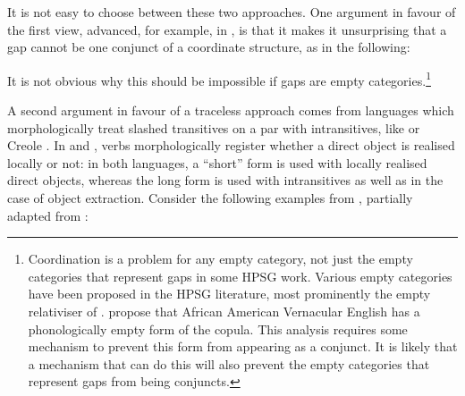 \documentclass[output=paper
,notxmath 
 	        ,biblatex
                ,babelshorthands
                ,newtxmath
                ,draftmode
                ,colorlinks, citecolor=brown
]{langscibook}
\begin{document}
It is not easy to choose between these two approaches. One argument in
favour of the first view, advanced, for example, in \citet[Section~3.5.2]{Bouma:Malouf:Sag:01}, is that it makes it unsurprising that a gap cannot be one
conjunct of a coordinate structure, as in the following:

\begin{exe} \ex \begin{xlist} \label{ex:UDC:22}

\end{xlist}
\end{exe}

\noindent
It is not obvious why this should be impossible if gaps are empty
categories.\footnote{Coordination is a problem for any empty category,
  not just the empty categories that represent gaps in some HPSG
  work. Various empty categories have been proposed in the HPSG
  literature, most prominently the empty relativiser of
  \citet[Chapter~5]{Pollard:Sag:94}. \citet[Section~15.3.5]{Sag:Wasow:ea:03}
  propose that African American Vernacular English has a
  phonologically empty form of the copula. This analysis requires some
  mechanism to prevent this form from appearing as a conjunct. It is
  likely that a mechanism that can do this will also prevent the empty
  categories that represent gaps from being conjuncts.
 }

 A second argument in favour of a traceless approach comes from
 languages which morphologically treat slashed transitives on a par
 with intransitives, like  \citep{crysmann_b04yom} or
  Creole  \citep{Henri10}. In 
 and , verbs morphologically register whether a direct
 object is realised locally or not: in both languages, a ``short''
 form is used with locally realised direct objects, whereas the long
 form is used with intransitives as well as in the case of object
 extraction. Consider the following examples from ,
 partially adapted from \citet[632--633]{newman_p00}:
\end{document}
